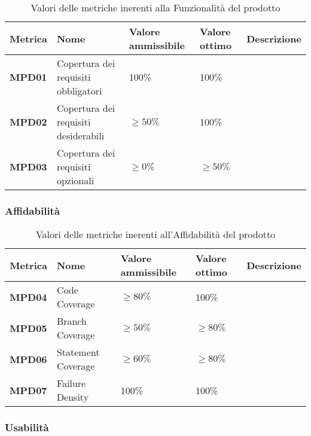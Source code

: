 \documentclass[italian,12pt]{article} %
\begin{document}
\begin{table}[h!]
	\centering
	\begin{tabularx}{\textwidth}{|X|X|X|X|X|} 	 
		\hline
		\textbf{Metrica} 	& \textbf{Nome} & \textbf{Valore ammissibile} & \textbf{Valore ottimo} & \textbf{Descrizione}\\  	 
		\hline
		\textbf{MPD01} & Copertura dei requisiti obbligatori & 100\%  & 100\% &\\
		\hline
		\textbf{MPD02} & Copertura dei requisiti desiderabili & $\geq 50\% $  & 100\% &\\ 
		\hline
		\textbf{MPD03} & Copertura dei requisiti opzionali & $\geq 0\% $ & $\geq 50\% $ &\\ 
		\hline
	\end{tabularx}
	\caption{ Valori delle metriche inerenti alla Funzionalità del prodotto}
	\label{table:7}
\end{table}

\subsubsection{Affidabilità}

\begin{table}[h!]
	\centering
	\begin{tabularx}{\textwidth}{|X|X|X|X|X|} 	 
		\hline
		\textbf{Metrica} 	& \textbf{Nome} & \textbf{Valore ammissibile} & \textbf{Valore ottimo} & \textbf{Descrizione}\\  	 
		\hline
		\textbf{MPD04} & Code Coverage & $\geq 80\% $  & 100\% &\\
		\hline
		\textbf{MPD05} & Branch Coverage & $\geq 50\% $  & $\geq 80\% $ &\\ 
		\hline
		\textbf{MPD06} & Statement Coverage & $\geq 60\% $ & $\geq 80\% $ &\\ 
		\hline
		\textbf{MPD07} & Failure Density & 100\%  & 100\%  &\\ 
		\hline
	\end{tabularx}
	\caption{ Valori delle metriche inerenti all'Affidabilità del prodotto}
	\label{table:8}
\end{table}


\subsubsection{Usabilità}
\end{document}
